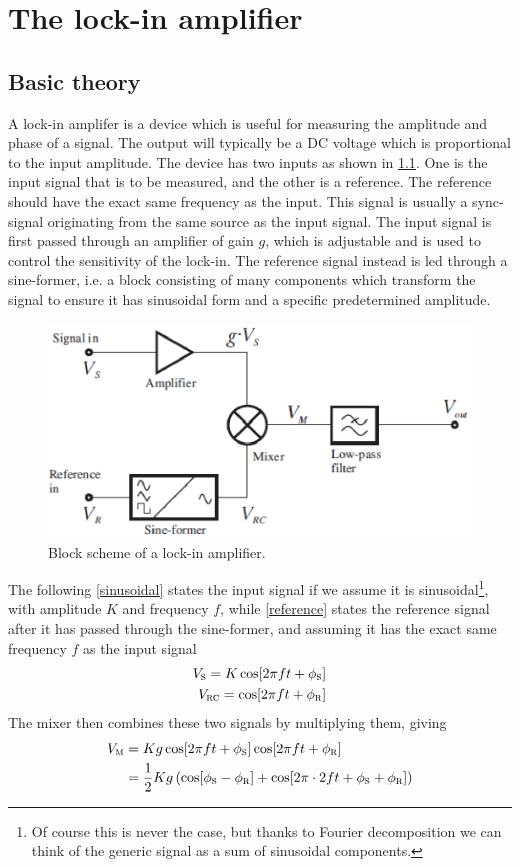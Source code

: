 \chapter{The lock-in amplifier}
	\section{Basic theory}
A lock-in amplifer is a device which is useful for measuring the amplitude and phase of a signal. The output will typically be a DC voltage which is proportional to the input amplitude. The device has two inputs as shown in \cref{lockin1}. One is the input signal that is to be measured, and the other is a reference. The reference should have the exact same frequency as the input. This signal is usually a sync-signal originating from the same source as the input signal. The input signal is first passed through an amplifier of gain $g$, which is adjustable and is used to control the sensitivity of the lock-in. The reference signal instead is led through a sine-former, i.e.  a block consisting of many components which transform the signal to ensure it has sinusoidal form and a specific predetermined amplitude.

\begin{figure}[!hbt]\centering
\includegraphics[width=\linewidth, draft=\foto]{eps/lockin1.eps}
\caption{Block scheme of a lock-in amplifier.}
\label{lockin1}
\end{figure}

The following \cref{sinusoidal} states the input signal if we assume it is sinusoidal\footnote{Of course this is never the case, but thanks to Fourier decomposition we can think of the generic signal as a sum of sinusoidal components.}, with amplitude $K$ and frequency $f$, while \cref{reference} states the reference signal after it has passed through the sine-former, and assuming it has the exact same frequency $f$ as the input signal
\begin{align}
V_{\mbox{\footnotesize{\scshape{s}}}}=K\cos[2\pi ft+\phi_{\mbox{\footnotesize{\scshape{s}}}}]
\label{sinusoidal}\\
V_{\mbox{\footnotesize{\scshape{rc}}}}=\cos[2\pi ft+\phi_{\mbox{\footnotesize{\scshape{r}}}}]
\label{reference}
\end{align}
The mixer then combines these two signals by multiplying them, giving
\begin{align}
V_{\mbox{\footnotesize{\scshape{m}}}}&=Kg\cos[2\pi ft+\phi_{\mbox{\footnotesize{\scshape{s}}}}]\cos[2\pi ft+\phi_{\mbox{\footnotesize{\scshape{r}}}}]\nonumber\\
&=\frac{1}{2}Kg\left(\cos[\phi_{\mbox{\footnotesize{\scshape{s}}}}-\phi_{\mbox{\footnotesize{\scshape{r}}}}]+\cos[2\pi\cdot2ft+\phi_{\mbox{\footnotesize{\scshape{s}}}}+\phi_{\mbox{\footnotesize{\scshape{r}}}}]\right)\label{mixer}
\end{align}

